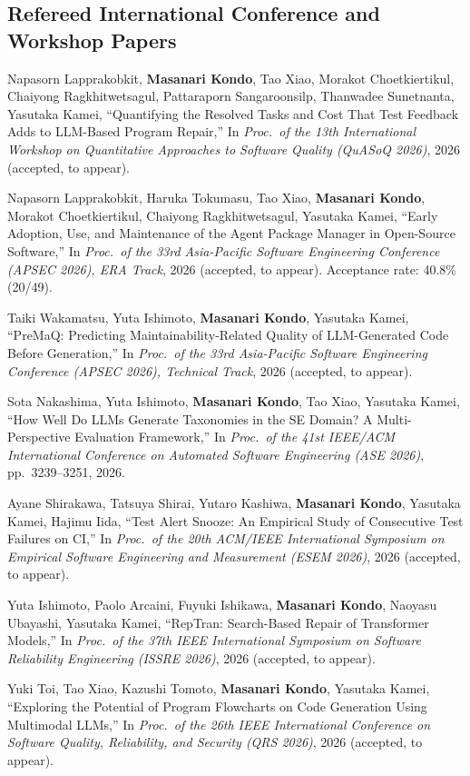 \documentclass[10pt,a4paper]{article}
\newcommand{\me}{\textbf{Masanari Kondo}}
\begin{document}
\subsection{Refereed International Conference and Workshop Papers}
\begin{publist}[label={[C\arabic*]}]
  \item Napasorn Lapprakobkit, \me, Tao Xiao, Morakot Choetkiertikul, Chaiyong Ragkhitwetsagul, Pattaraporn Sangaroonsilp, Thanwadee Sunetnanta, Yasutaka Kamei, ``Quantifying the Resolved Tasks and Cost That Test Feedback Adds to LLM-Based Program Repair,'' In \textit{Proc.\ of the 13th International Workshop on Quantitative Approaches to Software Quality (QuASoQ 2026)}, 2026 (accepted, to appear).
  \item Napasorn Lapprakobkit, Haruka Tokumasu, Tao Xiao, \me, Morakot Choetkiertikul, Chaiyong Ragkhitwetsagul, Yasutaka Kamei, ``Early Adoption, Use, and Maintenance of the Agent Package Manager in Open-Source Software,'' In \textit{Proc.\ of the 33rd Asia-Pacific Software Engineering Conference (APSEC 2026), ERA Track}, 2026 (accepted, to appear). Acceptance rate: 40.8\% (20/49).
  \item Taiki Wakamatsu, Yuta Ishimoto, \me, Yasutaka Kamei, ``PreMaQ: Predicting Maintainability-Related Quality of LLM-Generated Code Before Generation,'' In \textit{Proc.\ of the 33rd Asia-Pacific Software Engineering Conference (APSEC 2026), Technical Track}, 2026 (accepted, to appear).
  \item Sota Nakashima, Yuta Ishimoto, \me, Tao Xiao, Yasutaka Kamei, ``How Well Do LLMs Generate Taxonomies in the SE Domain? A Multi-Perspective Evaluation Framework,'' In \textit{Proc.\ of the 41st IEEE/ACM International Conference on Automated Software Engineering (ASE 2026)}, pp.\ 3239--3251, 2026.
  \item Ayane Shirakawa, Tatsuya Shirai, Yutaro Kashiwa, \me, Yasutaka Kamei, Hajimu Iida, ``Test Alert Snooze: An Empirical Study of Consecutive Test Failures on CI,'' In \textit{Proc.\ of the 20th ACM/IEEE International Symposium on Empirical Software Engineering and Measurement (ESEM 2026)}, 2026 (accepted, to appear).
  \item Yuta Ishimoto, Paolo Arcaini, Fuyuki Ishikawa, \me, Naoyasu Ubayashi, Yasutaka Kamei, ``RepTran: Search-Based Repair of Transformer Models,'' In \textit{Proc.\ of the 37th IEEE International Symposium on Software Reliability Engineering (ISSRE 2026)}, 2026 (accepted, to appear).
  \item Yuki Toi, Tao Xiao, Kazushi Tomoto, \me, Yasutaka Kamei, ``Exploring the Potential of Program Flowcharts on Code Generation Using Multimodal LLMs,'' In \textit{Proc.\ of the 26th IEEE International Conference on Software Quality, Reliability, and Security (QRS 2026)}, 2026 (accepted, to appear).

\end{publist}
\end{document}
